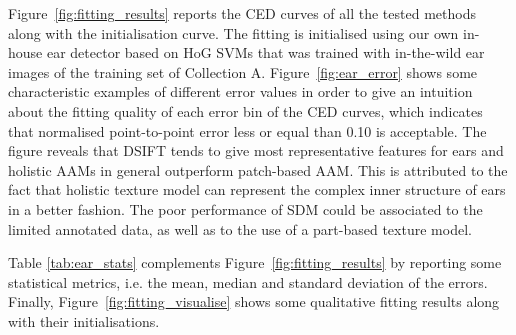 Figure~\ref{fig:fitting_results} reports the CED curves of all the tested methods along with the initialisation curve. The fitting is initialised using our own in-house ear detector based on HoG SVMs that was trained with in-the-wild ear images of the training set of Collection A. Figure~\ref{fig:ear_error} shows some characteristic examples of different error values in order to give an intuition about the fitting quality of each error bin of the CED curves, which indicates that normalised point-to-point error less or equal than 0.10 is acceptable. The figure reveals that DSIFT tends to give most representative features for ears and holistic AAMs in general outperform patch-based AAM. This is attributed to the fact that holistic texture model can represent the complex inner structure of ears in a better fashion. The poor performance of SDM could be associated to the limited annotated data, as well as to the use of a part-based texture model. 


Table \ref{tab:ear_stats} complements Figure~\ref{fig:fitting_results} by reporting some statistical metrics, i.e. the mean, median and standard deviation of the errors. Finally, Figure~\ref{fig:fitting_visualise} shows some qualitative fitting results along with their initialisations.







